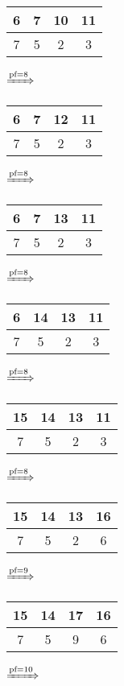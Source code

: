 \documentclass{article}
\begin{document}
\begin{enumerate}
\begin{tabular}{|c|c|c|c|}
            6 & 7 & 10 & 11\\
            \hline
            7 & 5 & 2 & 3\\
            \hline
         \end{tabular}
         $\xRightarrow{\text{pf}=8}$
         \begin{tabular}{|c|c|c|c|}
            \hline
            6 & 7 & 12 & 11\\
            \hline
            7 & 5 & 2 & 3\\
            \hline
         \end{tabular}
         $\xRightarrow{\text{pf}=8}$
         \begin{tabular}{|c|c|c|c|}
            \hline
            6 & 7 & 13 & 11\\
            \hline
            7 & 5 & 2 & 3\\
            \hline
         \end{tabular}
         $\xRightarrow{\text{pf}=8}$
         \begin{tabular}{|c|c|c|c|}
            \hline
            6 & 14 & 13 & 11\\
            \hline
            7 & 5 & 2 & 3\\
            \hline
         \end{tabular}
         $\xRightarrow{\text{pf}=8}$
         \begin{tabular}{|c|c|c|c|}
            \hline
            15 & 14 & 13 & 11\\
            \hline
            7 & 5 & 2 & 3\\
            \hline
         \end{tabular}
         $\xRightarrow{\text{pf}=8}$
         \begin{tabular}{|c|c|c|c|}
            \hline
            15 & 14 & 13 & 16\\
            \hline
            7 & 5 & 2 & 6\\
            \hline
         \end{tabular}
         $\xRightarrow{\text{pf}=9}$
         \begin{tabular}{|c|c|c|c|}
            \hline
            15 & 14 & 17 & 16\\
            \hline
            7 & 5 & 9 & 6\\
            \hline
         \end{tabular}
         $\xRightarrow{\text{pf}=10}$
         \begin{tabular}{|c|c|c|c|}
            \hline

\end{tabular}
\end{enumerate}
\end{document}
